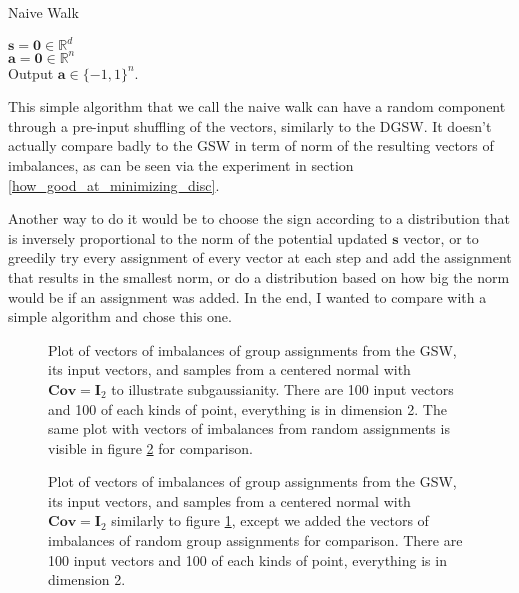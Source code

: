 \documentclass[12pt]{article}
\begin{document}
\begin{algorithm}[H]\label{naivewalk}
{\fontsize{10}{12}
\caption{Naive Walk}
   $\textbf{s}=\textbf{0}\in\mathbb{R}^d$\\
   $\textbf{a}=\textbf{0}\in\mathbb{R}^n$\\
    Output $\textbf{a}\in\{-1,1\}^n$.
    }%
    \end{algorithm}
This simple algorithm that we call the naive walk can have a random component through a pre-input shuffling of the vectors, similarly to the DGSW. It doesn't actually compare badly to the GSW in term of norm of the resulting vectors of imbalances, as can be seen via the experiment in section \ref{how_good_at_minimizing_disc}. 

Another way to do it would be to choose the sign according to a distribution that is inversely proportional to the norm of the potential updated $\textbf{s}$ vector, or to greedily try every assignment of every vector at each step and add the assignment that results in the smallest norm, or do a distribution based on how big the norm would be if an assignment was added. In the end, I wanted to compare with a simple algorithm and chose this one.

\begin{figure}[h!]

\caption{Plot of vectors of imbalances of group assignments from the GSW, its input vectors, and samples from a centered normal with $\textbf{Cov}=\textbf{I}_2$ to illustrate subgaussianity. There are 100 input vectors and 100 of each kinds of point, everything is in dimension 2. The same plot with vectors of imbalances from random assignments is visible in figure \ref{4types_4} for comparison.}
\label{4types_3}
\end{figure}
\begin{figure}[h!]

\caption{Plot of vectors of imbalances of group assignments from the GSW, its input vectors, and samples from a centered normal with $\textbf{Cov}=\textbf{I}_2$ similarly to figure \ref{4types_3}, except we added the vectors of imbalances of random group assignments for comparison. There are 100 input vectors and 100 of each kinds of point, everything is in dimension 2.}
\label{4types_4}
\end{figure}
\end{document}
